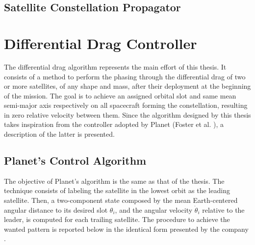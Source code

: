 \subsection{Satellite Constellation Propagator}



\section{Differential Drag Controller} \label{differential_drag_control_par}
The differential drag algorithm represents the main effort of this thesis.
It consists of a method to perform the phasing through the differential drag of two or more satellites, of any shape and mass, after their deployment at the beginning of the mission.
The goal is to achieve an assigned orbital slot and same mean semi-major axis respectively on all spacecraft forming the constellation, resulting in zero relative velocity between them.
Since the algorithm designed by this thesis takes inspiration from the controller adopted by Planet (Foster et al. \cite{foster2015orbit}), a description of the latter is presented.

\subsection{Planet's Control Algorithm} \label{planet_algorithm_par}
The objective of Planet's algorithm is the same as that of the thesis.
The technique consists of labeling the satellite in the lowest orbit as the leading satellite.
Then, a two-component state composed by the mean Earth-centered angular distance to its desired slot $\theta_i$, and the angular velocity $\dot{\theta}_i$ relative to the leader, is computed for each trailing satellite.
The procedure to achieve the wanted pattern is reported below in the identical form presented by the company \cite{foster2015orbit}.

